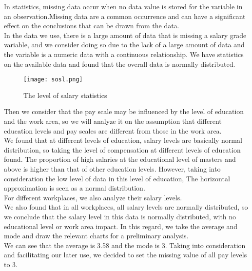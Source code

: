 \documentclass{mcmthesis}
\begin{document}
In statistics, missing data occur when no data value is stored for the variable in an observation.Missing data are a common occurrence and can have a significant effect on the conclusions that can be drawn from the data.\\
\newline
In the data we use, there is a large amount of data that is missing a salary grade variable, and we consider doing so due to the lack of a large amount of data and the variable is a numeric data with a continuous relationship. We have statistics on the available data and found that the overall data is normally distributed.\\
\begin{figure}[h]
\small
\centering
\texttt{[image: sosl.png]}
\caption{The level of salary statistics} \label{fig:The level of salary statistics}
\end{figure}
\newline
Then we consider that the pay scale may be influenced by the level of education and the work area, so we will analyze it on the assumption that different education levels and pay scales are different from those in the work area.\\
We found that at different levels of education, salary levels are basically normal distribution, so taking the level of compensation at different levels of education found. The proportion of high salaries at the educational level of masters and above is higher than that of other education levels. However, taking into consideration the low level of data in this level of education, The horizontal approximation is seen as a normal distribution.\\
\newline
For different workplaces, we also analyze their salary levels.\\
We also found that in all workplaces, all salary levels are normally distributed, so we conclude that the salary level in this data is normally distributed, with no educational level or work area impact.
\newline
In this regard, we take the average and mode and draw the relevant charts for a preliminary analysis.\\
We can see that the average is 3.58 and the mode is 3. Taking into consideration and facilitating our later use, we decided to set the missing value of all pay levels to 3.\\
\end{document}
